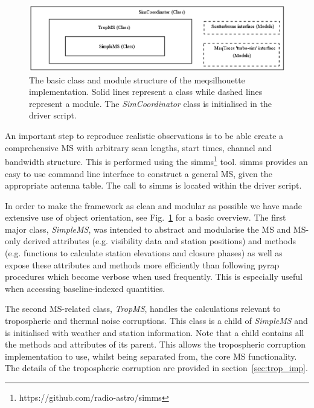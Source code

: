 

\begin{figure}
\includegraphics[width=\columnwidth]{Images/Class_module_structure}
\caption{The basic class and module structure of the {\sc meqsilhouette} implementation. Solid lines represent a class while dashed lines represent a module. The \emph{SimCoordinator} class is initialised in the driver script. \label{class_struc}%
}
\end{figure}

An important step to reproduce realistic observations is to be able create a comprehensive MS with arbitrary scan lengths, start times, channel and bandwidth structure. This is performed using the {\sc simms}\footnote{https://github.com/radio-astro/simms} tool. {\sc simms} provides an easy to use command line interface to construct a general MS, given the appropriate antenna table. The call to {\sc simms} is located within the driver script. 

In order to make the framework as clean and  modular as possible we have made extensive use of object orientation, see Fig.~\ref{class_struc} for a basic overview. The first major class, \emph{SimpleMS}, was intended to abstract and modularise the MS and MS-only derived attributes (e.g. visibility data and station positions) and methods (e.g. functions to calculate station elevations and closure phases) as well as expose these attributes and methods more efficiently than following {\sc pyrap} procedures which become verbose when used frequently. This is especially useful when accessing baseline-indexed quantities. 

The second MS-related class, \emph{TropMS}, handles the calculations relevant to tropospheric and thermal noise corruptions. This class is a child of {\it SimpleMS} and is initialised with weather and station information. Note that a child contains all the methods and attributes of its parent. This allows the tropospheric corruption implementation to use, whilst being separated from, the core MS functionality. The details of the tropospheric corruption are provided in section~\ref{sec:trop_imp}. 

